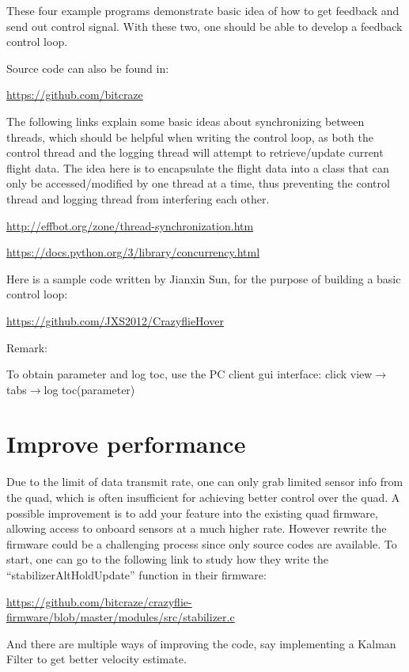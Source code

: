 \documentclass[11pt]{article}
\begin{document}
These four example programs demonstrate basic idea of how to get feedback and send out control signal. With these two, one should be able to develop a feedback control loop.

Source code can also be found in: 

\url{https://github.com/bitcraze}

The following links explain some basic ideas about synchronizing between threads, which should be helpful when writing the control loop, as both the control thread and the logging thread will attempt to retrieve/update current flight data. The idea here is to encapsulate the flight data into a class that can only be accessed/modified by one thread at a time, thus preventing the control thread and logging thread from interfering each other.

\url{http://effbot.org/zone/thread-synchronization.htm}

\url{https://docs.python.org/3/library/concurrency.html}

Here is a sample code written by Jianxin Sun, for the purpose of building a basic control loop:

\url{https://github.com/JXS2012/CrazyflieHover}

Remark:

To obtain parameter and log toc, use the PC client gui interface: click view$\rightarrow$tabs$\rightarrow$log toc(parameter)


\newpage
\section{Improve performance}
Due to the limit of data transmit rate, one can only grab limited sensor info from the quad, which is often insufficient for achieving better control over the quad. A possible improvement is to add your feature into the existing quad firmware, allowing access to onboard sensors at a much higher rate. However rewrite the firmware could be a challenging process since only source codes are available. To start, one can go to the following link to study how they write the ``stabilizerAltHoldUpdate'' function in their firmware:

\url{https://github.com/bitcraze/crazyflie-firmware/blob/master/modules/src/stabilizer.c}

And there are multiple ways of improving the code, say implementing a Kalman Filter to get better velocity estimate.
\end{document}
